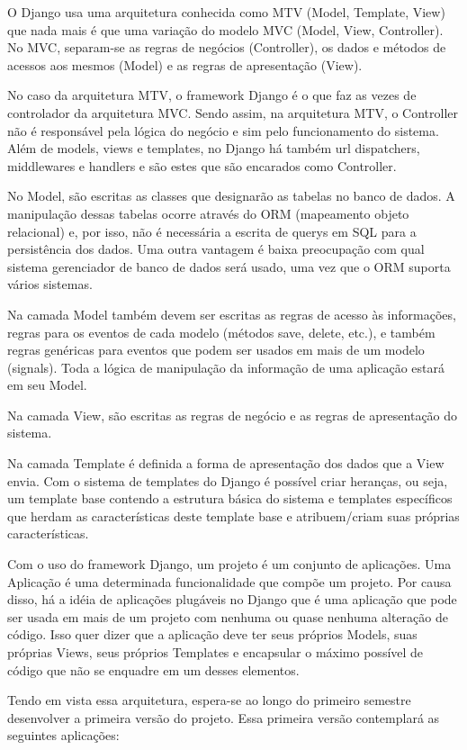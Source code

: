 \documentclass[a4paper,12pt,font=plain,header=plain]{abnt}
\begin{document}
	O Django usa uma arquitetura conhecida como MTV (Model, Template, View) que nada mais é que uma variação do modelo MVC (Model, View, Controller). No MVC, separam-se as regras de negócios (Controller), os dados e métodos de acessos aos mesmos (Model) e as regras de apresentação (View).

	No caso da arquitetura MTV, o framework Django é o que faz as vezes de controlador da arquitetura MVC. Sendo assim, na arquitetura MTV, o Controller não é responsável pela lógica do negócio e sim pelo funcionamento do sistema. Além de models, views e templates, no Django há também url dispatchers, middlewares e handlers e são estes que são encarados como Controller.
	
	No Model, são escritas as classes que designarão as tabelas no banco de dados. A manipulação dessas tabelas ocorre através do ORM (mapeamento objeto relacional) e, por isso, não é necessária a escrita de querys em SQL para a persistência dos dados. Uma outra vantagem é baixa preocupação com qual sistema gerenciador de banco de dados será usado, uma vez que o ORM suporta vários sistemas.
	
	Na camada Model também devem ser escritas as regras de acesso às informações, regras para os eventos de cada modelo (métodos save, delete, etc.), e também regras genéricas para eventos que podem ser usados em mais de um modelo (signals). Toda a lógica de manipulação da informação de uma aplicação estará em seu Model.
	
	Na camada View, são escritas as regras de negócio e as regras de apresentação do sistema.
	
	Na camada Template é definida a forma de apresentação dos dados que a View envia. Com o sistema de templates do Django é possível criar heranças, ou seja, um template base contendo a estrutura básica do sistema e templates específicos que herdam as características deste template base e atribuem/criam suas próprias características. 

	Com o uso do framework Django, um projeto é um conjunto de aplicações. Uma Aplicação é uma determinada funcionalidade que compõe um projeto. Por causa disso, há a idéia de aplicações plugáveis no Django que é uma aplicação que pode ser usada em mais de um projeto com nenhuma ou quase nenhuma alteração de código. Isso quer dizer que a aplicação deve ter seus próprios Models, suas próprias Views, seus próprios Templates e encapsular o máximo possível de código que não se enquadre em um desses elementos.

    	Tendo em vista essa arquitetura, espera-se ao longo do primeiro semestre desenvolver a primeira versão do projeto. Essa primeira versão contemplará as seguintes aplicações:
\end{document}
